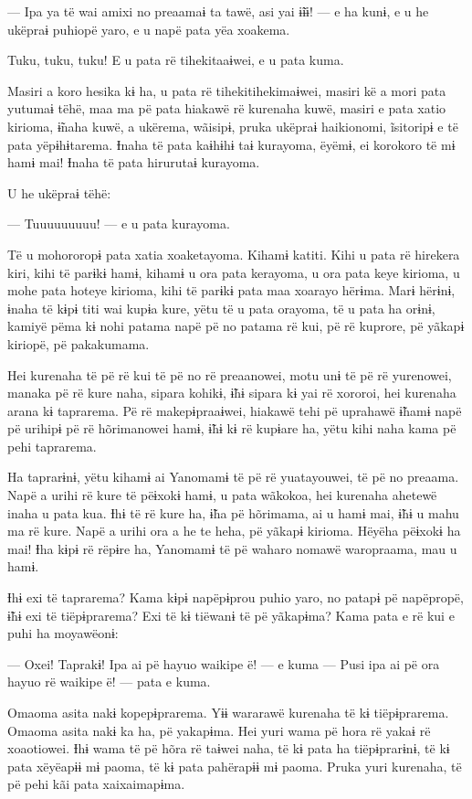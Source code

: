 --- Ipa ya të wai amixi no preaamaɨ ta tawë, asi yai ɨ̃ɨɨ! --- e ha kunɨ, e
u he ukëpraɨ puhiopë yaro, e u napë pata yëa xoakema. 

Tuku, tuku, tuku! E u pata rë tihekitaaɨwei, e u pata kuma. 

Masiri a koro hesika kɨ ha, u pata rë tihekitihekimaɨwei, masiri kë a
mori pata yutumaɨ tëhë, maa ma pë pata hiakawë rë kurenaha kuwë, masiri
e pata xatio kirioma, ɨ̃naha kuwë, a ukërema, wãisipɨ, pruka ukëpraɨ
haikionomi, ĩsitoripɨ e të pata yëpɨhɨtarema. Ɨnaha të pata kaɨhɨhɨ taɨ
kurayoma, ëyëmɨ, ei korokoro të mɨ hamɨ mai! Ɨnaha të pata hirurutaɨ
kurayoma. 

U he ukëpraɨ tëhë: 

--- Tuuuuuuuuu! --- e u pata kurayoma. 

Të u mohororopɨ pata xatia xoaketayoma. Kihamɨ katiti. Kihi u pata rë
hirekera kiri, kihi të parɨkɨ hamɨ, kihamɨ u ora pata kerayoma, u ora
pata keye kirioma, u mohe pata hoteye kirioma, kihi të parɨkɨ pata maa
xoarayo hërɨma. Marɨ hërɨnɨ, ɨnaha të kɨpɨ titi wai kupɨa kure, yëtu të
u pata orayoma, të u pata ha orɨnɨ, kamiyë pëma kɨ nohi patama napë pë
no patama rë kui, pë rë kuprore, pë yãkapɨ kiriopë, pë pakakumama. 

Hei kurenaha të pë rë kui të pë no rë preaanowei, motu unɨ të pë rë
yurenowei, manaka pë rë kure naha, sipara kohikɨ, ɨ̃hɨ sipara kɨ yai rë
xororoi, hei kurenaha arana kɨ taprarema. Pë rë makepɨpraaɨwei, hiakawë
tehi pë uprahawë ɨ̃hamɨ napë pë urihipɨ pë rë hõrimanowei hamɨ, ɨ̃hɨ kɨ rë
kupɨare ha, yëtu kihi naha kama pë pehi taprarema. 

Ha taprarɨnɨ, yëtu kihamɨ ai Yanomamɨ të pë rë yuatayouwei, të pë no
preaama. Napë a urihi rë kure të pëɨxokɨ hamɨ, u pata wãkokoa, hei
kurenaha ahetewë inaha u pata kua. Ɨhɨ të rë kure ha, ɨ̃ha pë hõrimama,
ai u hamɨ mai, ɨ̃hɨ u mahu ma rë kure. Napë a urihi ora a he te heha, pë
yãkapɨ kirioma. Hëyëha pëɨxokɨ ha mai! Ɨha kɨpɨ rë rëpɨre ha, Yanomamɨ
të pë waharo nomawë waropraama, mau u hamɨ. 

Ɨhɨ exi të taprarema? Kama kɨpɨ napëpɨprou puhio yaro, no patapɨ pë
napëpropë, ɨ̃hɨ exi të tiëpɨprarema? Exi të kɨ tiëwanɨ të pë yãkapɨma?
Kama pata e rë kui e puhi ha moyawëonɨ: 

--- Oxei! Taprakɨ! Ipa ai pë hayuo waikipe ë! --- e kuma --- Pusi ipa ai pë
ora hayuo rë waikipe ë! --- pata e kuma. 

Omaoma asita nakɨ kopepɨprarema. Yɨɨ wararawë kurenaha të kɨ
tiëpɨprarema. Omaoma asita nakɨ ka ha, pë yakapɨma. Hei yuri wama pë
hora rë yakaɨ rë xoaotiowei. Ɨhɨ wama të pë hõra rë taɨwei naha, të kɨ
pata ha tiëpɨprarɨnɨ, të kɨ pata xëyëapɨɨ mɨ paoma, të kɨ pata pahërapɨɨ
mɨ paoma. Pruka yuri kurenaha, të pë pehi kãi pata xaixaimapɨma. 


